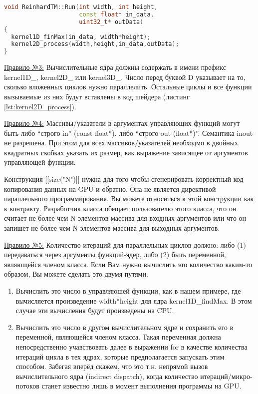 \documentclass[11pt,fleqn,english,russian]{report} %
\begin{document}
\begin{lstlisting}[language=C++, 
	               caption=реализация управляющей функции вызывающей вычислительные ядра, 
	               label=lst:RunFunc]	
void ReinhardTM::Run(int width, int height, 
                     const float* in_data, 
                     uint32_t* outData)
{
  kernel1D_finMax(in_data, width*height);
  kernel2D_process(width,height,in_data,outData);
}
\end{lstlisting}

\underline{Правило №3:} Вычислительные ядра должны содержать в имени префикс kernel1D\_, kernel2D\_ или kernel3D\_. Число перед буквой D указывает на то, сколько вложенных циклов нужно параллелить. Остальные циклы и все функции вызываемые из них будут вставлены в код шейдера (листинг \ref{lst:kernel2D_process}). 

\underline{Правило №4:} Массивы/указатели в аргументах управляющих функций могут быть либо ``строго in'' (const float*), либо ``строго out (float*)''. Семантика inout не разрешена. При этом для всех массивов/указателей необходмо в двойных квадратных скобках указать их размер, как выражение зависящее от аргументов управляющей функции.  

\begin{remark}
Конструкция [[size("N")]] нужна для того чтобы сгенерировать корректный код копирования данных на GPU и обратно. Она не является директивой параллельного программирования. Вы можете относиться к этой конструкции как к контракту. Разработчик класса обещает пользователю этого класса, что он считает не более чем N элементов массива для входных аргументов или что он запишет не более чем N элементов массива для выходных аргументов. 
\end{remark}	

\underline{Правило №5:} Количество итераций для параллельных циклов должно: либо (1) передаваться через аргументы функций-ядер, либо (2) быть переменной, являющейся членом класса. Если Вам нужно вычислить это количество каким-то образом, Вы можете сделать это двумя путями.
\begin{enumerate}
\item Вычислить это число в управляюшей функции, как в нашем примере, где вычисляется произведение width*height для ядра kernel1D\_findMax. В этом случае эти вычисления будут произведены на CPU.
\item Вычислить это число в другом вычислительном ядре и сохранить его в переменной, являющейся членом класса. Такая переменная должна непосредственно учавствовать далее в выражении for в качестве количества итераций цикла в тех ядрах, которые предполагается запускать этим способом. Забегая вперёд скажем, что это т.н. непрямой вызов вычислительного ядра (indirect dispatch), когда количество итераций/микро-потоков станет известно лишь в момент выполнения программы на GPU. 
\end{enumerate}
\end{document}
